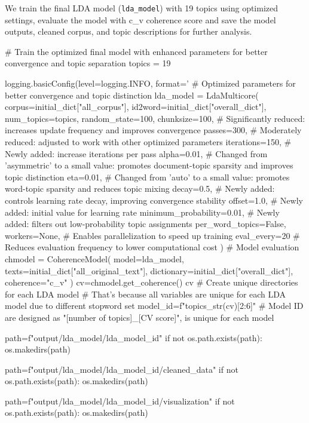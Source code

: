 \documentclass[12pt]{article}
\numberwithin{figure}{section}  %
\begin{document}
	We train the final LDA model (\texttt{lda\_model}) with 19 topics using optimized
	settings, evaluate the model with c\_v coherence score and save the model
	outputs, cleaned corpus, and topic descriptions for further analysis.
	\begin{python}
# Train the optimized final model with enhanced parameters for better convergence and topic separation
topics = 19

logging.basicConfig(level=logging.INFO, format='%
# Optimized parameters for better convergence and topic distinction
lda_model = LdaMulticore(
    corpus=initial_dict["all_corpus"],
    id2word=initial_dict["overall_dict"],
    num_topics=topics,
    random_state=100,
    chunksize=100,           # Significantly reduced: increases update frequency and improves convergence
    passes=300,              # Moderately reduced: adjusted to work with other optimized parameters
    iterations=150,          # Newly added: increase iterations per pass
    alpha=0.01,              # Changed from 'asymmetric' to a small value: promotes document-topic sparsity and improves topic distinction
    eta=0.01,                # Changed from 'auto' to a small value: promotes word-topic sparsity and reduces topic mixing
    decay=0.5,               # Newly added: controls learning rate decay, improving convergence stability
    offset=1.0,              # Newly added: initial value for learning rate
    minimum_probability=0.01, # Newly added: filters out low-probability topic assignments
    per_word_topics=False,
    workers=None,            # Enables parallelization to speed up training
    eval_every=20            # Reduces evaluation frequency to lower computational cost
)
# Model evaluation
chmodel = CoherenceModel(
        model=lda_model,
        texts=initial_dict["all_original_text"],
        dictionary=initial_dict["overall_dict"],
        coherence="c_v"
    )
cv=chmodel.get_coherence()
cv
# Create unique directories for each LDA model
# That's because all variables are unique for each LDA model due to different stopword set
model_id=f"{topics}_{str(cv)[2:6]}"
# Model ID are designed as "[number of topics]_[CV score]", is unique for each model

path=f"output/lda_model/lda_{model_id}"
if not os.path.exists(path):
    os.makedirs(path)

path=f"output/lda_model/lda_{model_id}/cleaned_data"
if not os.path.exists(path):
    os.makedirs(path)

path=f"output/lda_model/lda_{model_id}/visualization"
if not os.path.exists(path):
    os.makedirs(path)


\end{python}
\end{document}
